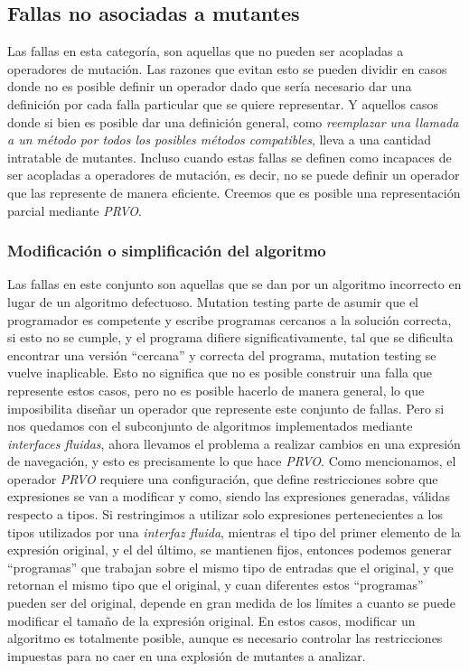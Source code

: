 \subsection{Fallas no asociadas a mutantes}

Las fallas en esta categor\'ia, son aquellas que no pueden ser acopladas a operadores de mutaci\'on. Las razones que evitan esto se pueden dividir en casos donde no es posible definir un operador dado que ser\'ia necesario dar una definici\'on por cada falla particular que se quiere representar. Y aquellos casos donde si bien es posible dar una definici\'on general, como \emph{reemplazar una llamada a un m\'etodo por todos los posibles m\'etodos compatibles}, lleva a una cantidad intratable de mutantes. Incluso cuando estas fallas se definen como incapaces de ser acopladas a operadores de mutaci\'on, es decir, no se puede definir un operador que las represente de manera eficiente. Creemos que es posible una representaci\'on parcial mediante \emph{PRVO}.

\subsubsection{Modificaci\'on o simplificaci\'on del algoritmo}

Las fallas en este conjunto son aquellas que se dan por un algoritmo incorrecto en lugar de un algoritmo defectuoso. Mutation testing parte de asumir que el programador es competente y escribe programas cercanos a la soluci\'on correcta, si esto no se cumple, y el programa difiere significativamente, tal que se dificulta encontrar una versi\'on ``cercana'' y correcta del programa, mutation testing se vuelve inaplicable. Esto no significa que no es posible construir una falla que represente estos casos, pero no es posible hacerlo de manera general, lo que imposibilita dise\~nar un operador que represente este conjunto de fallas. Pero si nos quedamos con el subconjunto de algoritmos implementados mediante \emph{interfaces fluidas}, ahora llevamos el problema a realizar cambios en una expresi\'on de navegaci\'on, y esto es precisamente lo que hace \emph{PRVO}. Como mencionamos, el operador \emph{PRVO} requiere una configuraci\'on, que define restricciones sobre que expresiones se van a modificar y como, siendo las expresiones generadas, v\'alidas respecto a tipos. Si restringimos a utilizar solo expresiones pertenecientes a los tipos utilizados por una \emph{interfaz fluida}, mientras el tipo del primer elemento de la expresi\'on original, y el del \'ultimo, se mantienen fijos, entonces podemos generar ``programas'' que trabajan sobre el mismo tipo de entradas que el original, y que retornan el mismo tipo que el original, y cuan diferentes estos ``programas'' pueden ser del original, depende en gran medida de los l\'imites a cuanto se puede modificar el tama\~no de la expresi\'on original. En estos casos, modificar un algoritmo es totalmente posible, aunque es necesario controlar las restricciones impuestas para no caer en una explosi\'on de mutantes a analizar.

